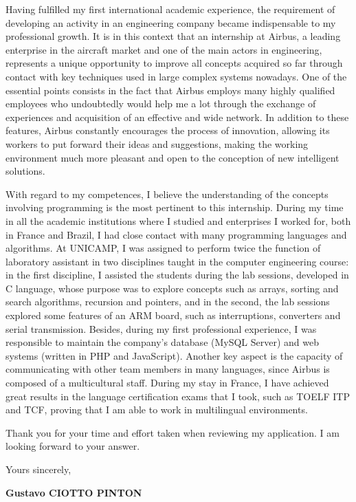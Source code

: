 \documentclass[12pt, a4paper]{article}
\begin{document}
\vspace{12pt}

Having fulfilled my first international academic experience, the requirement of
developing an activity in an engineering company became indispensable to my
professional growth. It is in this context that an internship at Airbus, a
leading enterprise in the aircraft market and one of the main actors in
engineering, represents a unique opportunity to improve all concepts acquired
so far through contact with key techniques used in large complex systems
nowadays.  One of the essential points consists in the fact that Airbus employs
many highly qualified employees who undoubtedly would help me a lot through
the exchange of experiences and acquisition of an effective and wide
network. In addition  to these features, Airbus constantly encourages
the process of innovation, allowing its workers to put forward their ideas and
suggestions, making the working environment much more pleasant and open to the
conception of new intelligent solutions. 


\vspace{12pt}

With regard to my competences,  I believe the understanding of the concepts
involving programming is the most pertinent to this internship. During my time
in all the academic institutions where I studied and enterprises I worked for,
both in France and Brazil, I had close contact with many programming languages
and algorithms. At UNICAMP, I was assigned to perform twice the function of
laboratory assistant in two disciplines taught in the computer engineering
course: in the first discipline, I assisted the students during the lab
sessions, developed in C language, whose purpose was to explore concepts such as
arrays, sorting and search algorithms, recursion and pointers, and in
the second, the lab sessions explored some features of an ARM board, such as
interruptions, converters and serial transmission. Besides, during my first
professional experience, I was responsible to maintain the company's database
(MySQL Server) and web systems (written in PHP and
JavaScript). Another key aspect is the capacity of communicating with
other team members in many languages, since Airbus is composed of a
multicultural staff. During my stay in France, I have achieved great results in
the language certification exams that I took, such as TOELF ITP and
TCF, proving that I am able to work in multilingual environments.

	
\vspace{12pt}

Thank you for your time and effort taken when reviewing my application. I am
looking forward to your answer.

\vspace{12pt}

Yours sincerely,

\begin{flushright}
\textbf{Gustavo CIOTTO PINTON}
\end{flushright}
\end{document}
